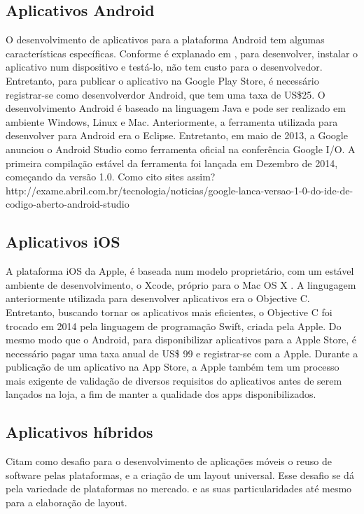 \subsection{Aplicativos Android}\label{sub_sec:android_apps}


O desenvolvimento de aplicativos para a plataforma Android  tem algumas características específicas. Conforme é explanado em \cite{6248786}, para desenvolver, instalar o aplicativo num dispositivo e testá-lo, não tem custo para o desenvolvedor. Entretanto, para publicar o aplicativo na Google Play Store, é necessário registrar-se como desenvolverdor Android, que tem uma taxa de US\$25.
O desenvolvimento Android é baseado na linguagem Java e pode ser realizado em ambiente Windows, Linux e Mac. Anteriormente, a ferramenta utilizada para desenvolver para Android era o Eclipse. Entretanto, em maio de 2013, a Google anunciou o Android Studio como ferramenta oficial na conferência Google I/O. A primeira compilação estável da ferramenta foi lançada em Dezembro de 2014, começando da versão 1.0.
Como cito sites  assim?http://exame.abril.com.br/tecnologia/noticias/google-lanca-versao-1-0-do-ide-de-codigo-aberto-android-studio


\subsection{Aplicativos iOS}\label{sub_sec:ios_apps}


A plataforma iOS da Apple, é baseada num modelo proprietário, com um estável  ambiente de desenvolvimento, o Xcode, próprio para o Mac OS X \cite{6248786}. A lingugagem anteriormente utilizada para desenvolver aplicativos era o Objective C. Entretanto, buscando tornar os aplicativos mais eficientes, o Objective C foi trocado em 2014 pela linguagem de programação Swift, criada pela Apple. Do mesmo modo que o Android, para disponibilizar aplicativos para a Apple Store, é necessário pagar uma taxa anual de US\$ 99 e registrar-se com a Apple. Durante a publicação de um aplicativo na App Store, a Apple também tem um processo mais exigente de validação de diversos requisitos do aplicativos antes de serem lançados na loja, a fim de manter a qualidade dos apps disponibilizados.


\subsection{Aplicativos híbridos}\label{sub_sec:hybrid_apps}


\cite{dehlinger2011mobile} Citam como desafio para o desenvolvimento de aplicações móveis o reuso de software pelas plataformas, e a criação de um layout universal. Esse desafio se dá pela variedade de plataformas no mercado. e as suas particularidades até mesmo para a elaboração de layout.

